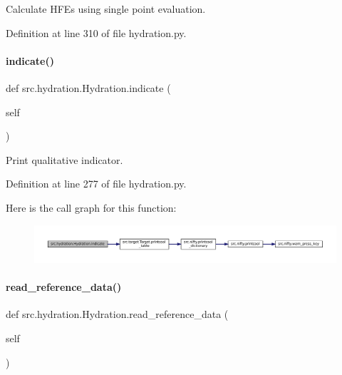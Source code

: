 Calculate H\+F\+Es using single point evaluation. 



Definition at line 310 of file hydration.\+py.

\mbox{\label{classsrc_1_1hydration_1_1Hydration_adbe65779ff1ec23208f16ee0a7392a97}} 
\paragraph{\texorpdfstring{indicate()}{indicate()}}
{\footnotesize\ttfamily def src.\+hydration.\+Hydration.\+indicate (\begin{DoxyParamCaption}\item[{}]{self }\end{DoxyParamCaption})}



Print qualitative indicator. 



Definition at line 277 of file hydration.\+py.

Here is the call graph for this function\+:
\nopagebreak
\begin{figure}[H]
\begin{center}
\leavevmode
\includegraphics[width=350pt]{classsrc_1_1hydration_1_1Hydration_adbe65779ff1ec23208f16ee0a7392a97_cgraph}
\end{center}
\end{figure}
\mbox{\label{classsrc_1_1hydration_1_1Hydration_ae5cf28d296c63f8cbd125880fbf8d123}} 
\paragraph{\texorpdfstring{read\+\_\+reference\+\_\+data()}{read\_reference\_data()}}
{\footnotesize\ttfamily def src.\+hydration.\+Hydration.\+read\+\_\+reference\+\_\+data (\begin{DoxyParamCaption}\item[{}]{self }\end{DoxyParamCaption})}



